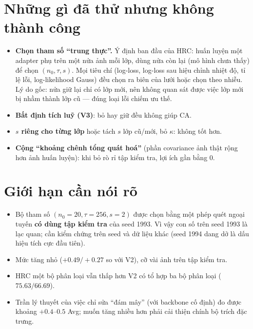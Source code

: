 \documentclass[11pt]{article}
\begin{document}
\section{Những gì đã thử nhưng không thành công}
\begin{itemize}
\item \textbf{Chọn tham số ``trung thực''.} Ý định ban đầu của HRC: huấn luyện một adapter phụ trên một nửa ảnh mỗi
      lớp, dùng nửa còn lại (mô hình chưa thấy) để chọn $(n_0,\tau,s)$. Mọi tiêu chí (log-loss, log-loss sau hiệu chỉnh
      nhiệt độ, tỉ lệ lỗi, log-likelihood Gauss) đều chọn ra biên của lưới hoặc chọn theo nhiễu. Lý do gốc: nửa giữ lại
      chỉ có lớp mới, nên không quan sát được việc lớp mới bị nhầm thành lớp cũ --- đúng loại lỗi chiếm ưu thế.
\item \textbf{Bất định tích luỹ (V3)}: bỏ hay giữ đều không giúp CA.
\item \textbf{$s$ riêng cho từng lớp} hoặc tách $s$ lớp cũ/mới, bỏ $\kappa$: không tốt hơn.
\item \textbf{Cộng ``khoảng chênh tổng quát hoá''} (phần covariance ảnh thật rộng hơn ảnh huấn luyện): khi bỏ rò rỉ
      tập kiểm tra, lợi ích gần bằng 0.
\end{itemize}

\section{Giới hạn cần nói rõ}
\begin{itemize}
\item Bộ tham số $(n_0=20,\tau=256,s=2)$ được chọn bằng một phép quét ngoại tuyến \textbf{có dùng tập kiểm tra} của
      seed 1993. Vì vậy con số trên seed 1993 là lạc quan; cần kiểm chứng trên seed và dữ liệu khác (seed 1994 dang dở
      là dấu hiệu tích cực đầu tiên).
\item Mức tăng nhỏ ($+0.49/+0.27$ so với V2), cỡ vài ảnh trên tập kiểm tra.
\item HRC một bộ phân loại vẫn thấp hơn V2 có tổ hợp ba bộ phân loại ($75.63/66.69$).
\item Trần lý thuyết của việc chỉ sửa ``đám mây'' (với backbone cố định) đo được khoảng $+0.4$--$0.5$ Avg; muốn tăng
      nhiều hơn phải cải thiện chính bộ trích đặc trưng.
\end{itemize}
\end{document}
